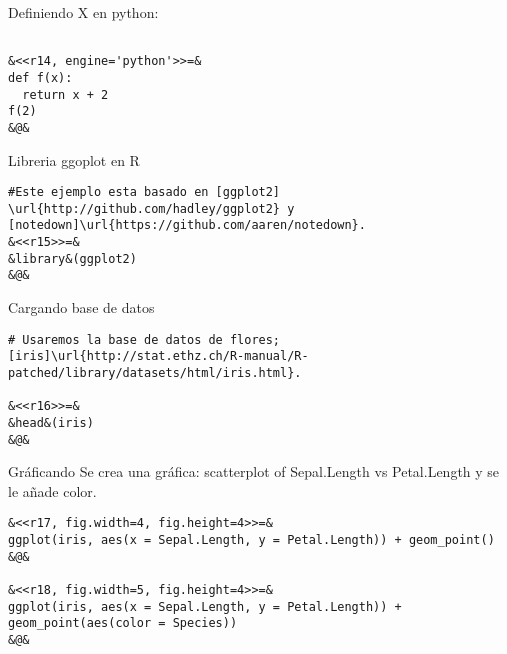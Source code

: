 \documentclass[11pt]{beamer}					%
\begin{document}
\begin{frame}[fragile]
					\begin{block}{Definiendo X en python:}
					\begin{tiny}\begin{lstlisting}[frame=single,style=base]				

&<<r14, engine='python'>>=&
def f(x):
  return x + 2
f(2)
&@&
				\end{lstlisting}	\end{tiny}
				\end{block}	
				\begin{block}{Libreria ggoplot en R}
					\begin{tiny}\begin{lstlisting}[frame=single,style=base]				
#Este ejemplo esta basado en [ggplot2] \url{http://github.com/hadley/ggplot2} y [notedown]\url{https://github.com/aaren/notedown}.
&<<r15>>=&
&library&(ggplot2)
&@&
				\end{lstlisting}	\end{tiny}
				\end{block}
						\begin{block}{Cargando base de datos}
					\begin{tiny}\begin{lstlisting}[frame=single,style=base]				
# Usaremos la base de datos de flores; [iris]\url{http://stat.ethz.ch/R-manual/R-patched/library/datasets/html/iris.html}.

&<<r16>>=&
&head&(iris)
&@&
				\end{lstlisting}	\end{tiny}
				\end{block}
			\end{frame}		
			
					
				\begin{frame}[fragile]
					\begin{block}{Gráficando}
					Se crea una gráfica: scatterplot of Sepal.Length vs Petal.Length y se le añade color.

					\begin{tiny}\begin{lstlisting}[frame=single,style=base]				
&<<r17, fig.width=4, fig.height=4>>=&
ggplot(iris, aes(x = Sepal.Length, y = Petal.Length)) + geom_point()
&@&

&<<r18, fig.width=5, fig.height=4>>=&
ggplot(iris, aes(x = Sepal.Length, y = Petal.Length)) +  geom_point(aes(color = Species))
&@&
				\end{lstlisting}	\end{tiny}
				\end{block}	
										
			\end{frame}
			
\end{document}
